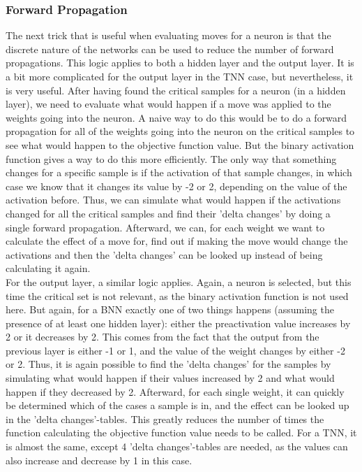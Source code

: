 \subsubsection{Forward Propagation}
The next trick that is useful when evaluating moves for a neuron is that the discrete nature of the networks can be used to reduce the number of forward propagations. This logic applies to both a hidden layer and the output layer. It is a bit more complicated for the output layer in the TNN case, but nevertheless, it is very useful. After having found the critical samples for a neuron (in a hidden layer), we need to evaluate what would happen if a move was applied to the weights going into the neuron. A naive way to do this would be to do a forward propagation for all of the weights going into the neuron on the critical samples to see what would happen to the objective function value. But the binary activation function gives a way to do this more efficiently. The only way that something changes for a specific sample is if the activation of that sample changes, in which case we know that it changes its value by -2 or 2, depending on the value of the activation before. Thus, we can simulate what would happen if the activations changed for all the critical samples and find their 'delta changes' by doing a single forward propagation. Afterward, we can, for each weight we want to calculate the effect of a move for, find out if making the move would change the activations and then the 'delta changes' can be looked up instead of being calculating it again. \\

\noindent For the output layer, a similar logic applies. Again, a neuron is selected, but this time the critical set is not relevant, as the binary activation function is not used here. But again, for a BNN exactly one of two things happens (assuming the presence of at least one hidden layer): either the preactivation value increases by 2 or it decreases by 2. This comes from the fact that the output from the previous layer is either -1 or 1, and the value of the weight changes by either -2 or 2. Thus, it is again possible to find the 'delta changes' for the samples by simulating what would happen if their values increased by 2 and what would happen if they decreased by 2. Afterward, for each single weight, it can quickly be determined which of the cases a sample is in, and the effect can be looked up in the 'delta changes'-tables. This greatly reduces the number of times the function calculating the objective function value needs to be called. For a TNN, it is almost the same, except 4 'delta changes'-tables are needed, as the values can also increase and decrease by 1 in this case. 

